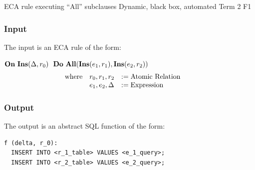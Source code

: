\documentclass[12pt]{report}
\begin{document}





{ECA rule executing ``All'' subclauses}  %
{Dynamic, black box, automated}  
{Term 2}
{F1}
\vspace{-12pt}\subsubsection*{Input}
The input is an ECA rule of the form:

$\mathbf{On~} \mathbf{Ins}(\Delta,r_0) \,\,\,\,\mathbf{Do~} \mathbf{All} ( \mathbf{Ins}(e_1,r_1), \mathbf{Ins}(e_2,r_2) )$
\vspace{-10pt}\[\hspace{-20pt}\begin{array}{lll}
\text{where} & r_0, r_1, r_2    & := \text{Atomic Relation} \\ 
             & e_1, e_2, \Delta & := \text{Expression} \\ 
\end{array}\]

\vspace{-12pt}\subsubsection*{Output}

The output is an abstract SQL function of the form:
\begin{verbatim}
f (delta, r_0):
  INSERT INTO <r_1_table> VALUES <e_1_query>;
  INSERT INTO <r_2_table> VALUES <e_2_query>;
\end{verbatim}
\end{document}
